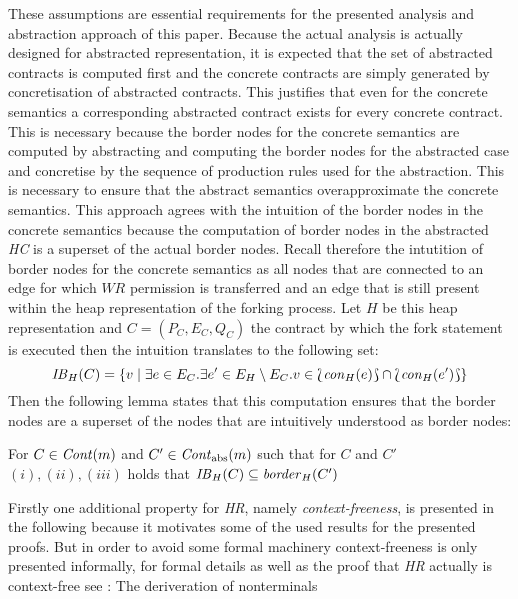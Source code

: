 	These assumptions are essential requirements for the presented analysis and
	abstraction approach of this paper. Because the actual analysis is actually
	designed for abstracted representation, it is expected that the set of
	abstracted contracts is computed first and the concrete contracts are simply
	generated by concretisation of abstracted contracts. This justifies that
	even for the concrete semantics a corresponding abstracted contract exists
	for every concrete contract. This is necessary because the border nodes for
	the concrete semantics are computed by abstracting and computing the border
	nodes for the abstracted case and concretise by the sequence of production
	rules used for the abstraction. This is necessary to ensure that the
	abstract semantics overapproximate the concrete semantics. This approach
	agrees with the intuition of the border
	nodes in the concrete semantics because the computation of border nodes in
	the abstracted \emph{\ac{HC}} is a superset of the actual border nodes.
	Recall therefore the intutition of border nodes for the
	concrete semantics as all nodes that are connected to an edge for which
	$\mathit{WR}$ permission is transferred and an edge that is still present 
	within the heap representation of the forking process. Let $H$ be this heap
	representation and $C = (P_{C}, E_{C}, Q_{C})$ the contract by which the
	fork statement is executed then the intuition translates to the following
	set:
	\begin{equation*}
		\mathit{IB}_{H}(C) = \{v\mid \exists e\in E_{C}.\exists e'\in E_{H}
			\setminus E_{C}.v\in\Lbag\mathit{con}_{H}(e)\Rbag
			\cap\Lbag\mathit{con}_{H}(e')\Rbag\}
	\end{equation*}
	Then the following lemma states that this computation
	ensures that the border nodes are a superset of the nodes that are
	intuitively understood as border nodes:
	\begin{lemma}
		For $C\in\mathit{Cont}(m)$ and $C'\in\mathit{Cont}_{\text{abs}}(m)$ such that for $C$ and
		$C'$ $(i),(ii),(iii)$ holds that
		$\mathit{IB}_{H}(C)\subseteq\mathit{border}_{H}(C')$
	\end{lemma}
	Firstly one additional property for
	\emph{\ac{HR}}, namely \emph{context-freeness}, is presented in
	the following because it motivates some of the used results for the
	presented proofs. But in order to avoid some formal machinery
	context-freeness is only presented informally, for formal details as well as
	the proof that \emph{\ac{HR}} actually is context-free see
	\cite[pp. 111-115]{HandbookGraphGrammars}: The deriveration of nonterminals
